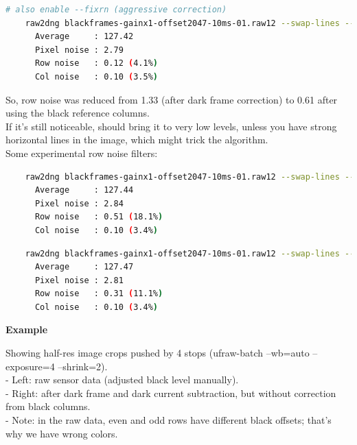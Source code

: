 \begin{lstlisting}[language=bash,morekeywords=$,keywordstyle=\bfseries,frame=none,xleftmargin=.25in,belowskip=2em, aboveskip=2em]
    # also enable --fixrn (aggressive correction)
    raw2dng blackframes-gainx1-offset2047-10ms-01.raw12 --swap-lines --fixrn --check-darkframe
      Average     : 127.42
      Pixel noise : 2.79
      Row noise   : 0.12 (4.1%)
      Col noise   : 0.10 (3.5%)
\end{lstlisting}

So, row noise was reduced from 1.33 (after dark frame correction) to 0.61 after using the black reference columns.\\

If it's still noticeable,  should bring it to very low levels, unless you have strong horizontal lines in the image, which might trick the algorithm.\\

Some experimental row noise filters:\\

\begin{lstlisting}[language=bash,morekeywords=$,keywordstyle=\bfseries,frame=none,xleftmargin=.25in,belowskip=2em, aboveskip=2em]
    % 2-tap FIR, separate for odd/even rows
    raw2dng blackframes-gainx1-offset2047-10ms-01.raw12 --swap-lines --rnfilter=1 --check-darkframe
      Average     : 127.44
      Pixel noise : 2.84
      Row noise   : 0.51 (18.1%)
      Col noise   : 0.10 (3.4%)
\end{lstlisting}

\begin{lstlisting}[language=bash,morekeywords=$,keywordstyle=\bfseries,frame=none,xleftmargin=.25in,belowskip=2em, aboveskip=2em]
    % that ugly FIR that also looks at green channel differences
    raw2dng blackframes-gainx1-offset2047-10ms-01.raw12 --swap-lines --rnfilter=2 --check-darkframe
      Average     : 127.47
      Pixel noise : 2.81
      Row noise   : 0.31 (11.1%)
      Col noise   : 0.10 (3.4%)
\end{lstlisting}


\textbf{Example}

Showing half-res image crops pushed by 4 stops (ufraw-batch --wb=auto --exposure=4 --shrink=2).\\


- Left: raw sensor data (adjusted black level manually).\\
- Right: after dark frame and dark current subtraction, but without correction from black columns.\\
- Note: in the raw data, even and odd rows have different black offsets; that's why we have wrong colors.\\ 

